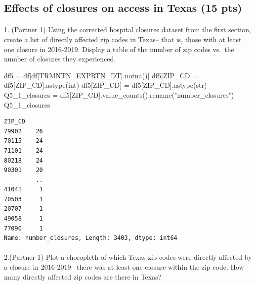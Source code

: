 \documentclass[
  letterpaper,
  DIV=11,
  numbers=noendperiod]{scrartcl}
\makeatletter
\let\oldparagraph\paragraph
\renewcommand{\paragraph}{
    \@ifstar
      \xxxParagraphStar
      \xxxParagraphNoStar
  }
\newcommand{\xxxParagraphStar}[1]{\oldparagraph*{#1}\mbox{}}
\newcommand{\xxxParagraphNoStar}[1]{\oldparagraph{#1}\mbox{}}
\newenvironment{Shaded}{\begin{snugshade}}{\end{snugshade}}
\newcommand{\BuiltInTok}[1]{\textcolor[rgb]{0.00,0.23,0.31}{#1}}
\newcommand{\NormalTok}[1]{\textcolor[rgb]{0.00,0.23,0.31}{#1}}
\newcommand{\OperatorTok}[1]{\textcolor[rgb]{0.37,0.37,0.37}{#1}}
\newcommand{\StringTok}[1]{\textcolor[rgb]{0.13,0.47,0.30}{#1}}
\makeatother
\begin{document}
\subsection{Effects of closures on access in Texas (15
pts)}\label{effects-of-closures-on-access-in-texas-15-pts}

\paragraph{1. (Partner 1) Using the corrected hospital closures dataset
from the first section, create a list of directly affected zip codes in
Texas-- that is, those with at least one closure in 2016-2019. Display a
table of the number of zip codes vs.~the number of closures they
experienced.}\label{partner-1-using-the-corrected-hospital-closures-dataset-from-the-first-section-create-a-list-of-directly-affected-zip-codes-in-texas-that-is-those-with-at-least-one-closure-in-2016-2019.-display-a-table-of-the-number-of-zip-codes-vs.-the-number-of-closures-they-experienced.}

\begin{Shaded}
\begin{Highlighting}[]
\NormalTok{df5 }\OperatorTok{=}\NormalTok{ df[df[}\StringTok{\textquotesingle{}TRMNTN\_EXPRTN\_DT\textquotesingle{}}\NormalTok{].notna()]}
\NormalTok{df5[}\StringTok{\textquotesingle{}ZIP\_CD\textquotesingle{}}\NormalTok{] }\OperatorTok{=}\NormalTok{ df5[}\StringTok{\textquotesingle{}ZIP\_CD\textquotesingle{}}\NormalTok{].astype(}\BuiltInTok{int}\NormalTok{)}
\NormalTok{df5[}\StringTok{\textquotesingle{}ZIP\_CD\textquotesingle{}}\NormalTok{] }\OperatorTok{=}\NormalTok{ df5[}\StringTok{\textquotesingle{}ZIP\_CD\textquotesingle{}}\NormalTok{].astype(}\BuiltInTok{str}\NormalTok{)}
\NormalTok{Q5\_1\_closures }\OperatorTok{=}\NormalTok{ df5[}\StringTok{\textquotesingle{}ZIP\_CD\textquotesingle{}}\NormalTok{].value\_counts().rename(}\StringTok{"number\_closures"}\NormalTok{)}
\NormalTok{Q5\_1\_closures}
\end{Highlighting}
\end{Shaded}

\begin{verbatim}
ZIP_CD
79902    26
70115    24
71101    24
80218    24
90301    20
         ..
41041     1
70503     1
20707     1
49058     1
77090     1
Name: number_closures, Length: 3403, dtype: int64
\end{verbatim}

\paragraph{2.(Partner 1) Plot a choropleth of which Texas zip codes were
directly affected by a closure in 2016-2019-- there was at least one
closure within the zip code. How many directly affected zip codes are
there in
Texas?}\label{partner-1-plot-a-choropleth-of-which-texas-zip-codes-were-directly-affected-by-a-closure-in-2016-2019-there-was-at-least-one-closure-within-the-zip-code.-how-many-directly-affected-zip-codes-are-there-in-texas}
\end{document}
